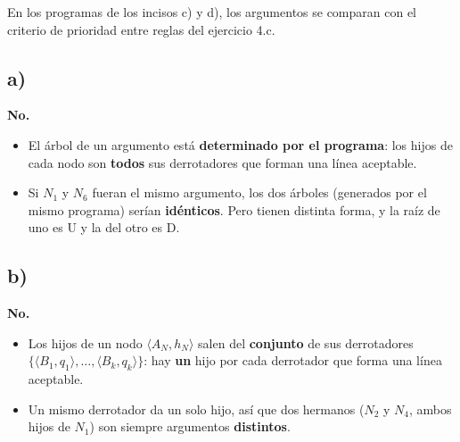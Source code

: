 \documentclass[11pt,a4paper]{article}
\begin{document}
En los programas de los incisos c) y d), los argumentos se comparan con el criterio de prioridad entre reglas del ejercicio 4.c.

\subsection{a)}

\begin{center}
\begin{minipage}{\linewidth}
\centering
{}
\end{minipage}
\end{center}

\textbf{No.}
\begin{itemize}
  \item El árbol de un argumento está \textbf{determinado por el programa}: los hijos de cada nodo son \textbf{todos} sus derrotadores que forman una línea aceptable.
  \item Si $N_1$ y $N_6$ fueran el mismo argumento, los dos árboles (generados por el mismo programa) serían \textbf{idénticos}. Pero tienen distinta forma, y la raíz de uno es U y la del otro es D.
\end{itemize}

\subsection{b)}

\begin{center}
\begin{minipage}{\linewidth}
\centering
{}
\end{minipage}
\end{center}

\textbf{No.}
\begin{itemize}
  \item Los hijos de un nodo $\langle A_N, h_N\rangle$ salen del \textbf{conjunto} de sus derrotadores $\{\langle B_1, q_1\rangle, \dots, \langle B_k, q_k\rangle\}$: hay \textbf{un} hijo por cada derrotador que forma una línea aceptable.
  \item Un mismo derrotador da un solo hijo, así que dos hermanos ($N_2$ y $N_4$, ambos hijos de $N_1$) son siempre argumentos \textbf{distintos}.
\end{itemize}
\end{document}
